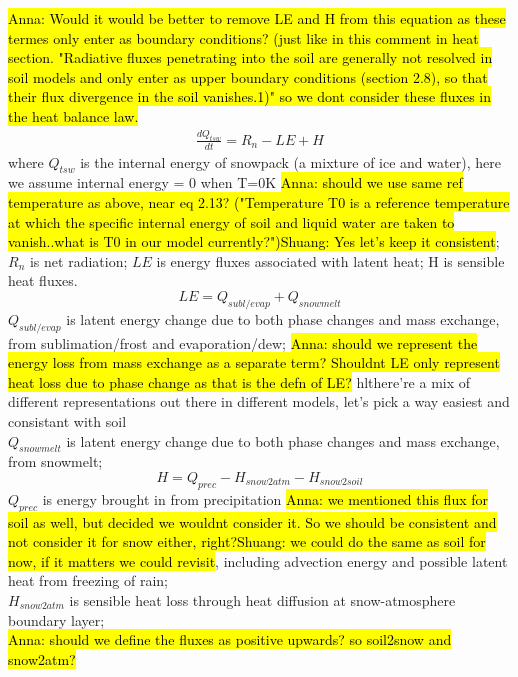 \documentclass{article}
\begin{document}
\hl{Anna: Would it would be better to remove LE and H from this equation as these termes only enter as boundary conditions? (just like in this comment in heat section. "Radiative
fluxes penetrating into the soil are generally not resolved in soil models and only
enter as upper boundary conditions (section 2.8), so that their flux divergence in
the soil vanishes.1)" so we dont consider these fluxes in the heat balance law.}
\begin{equation}
\begin{split}
\frac{dQ_{tsw}}{dt} = R_n - LE + H
\end{split}
\end{equation}
where $Q_{tsw}$ is the internal energy of snowpack (a mixture of ice and water), here we assume internal energy = 0 when T=0K \hl{Anna: should we use same ref temperature as above, near eq 2.13? ("Temperature T0 is a reference temperature at which the specific internal energy of
soil and liquid water are taken to vanish..what is T0 in our model currently?")}\hl{Shuang: Yes let's keep it consistent}; $R_n$ is net radiation; $LE$ is energy fluxes associated with latent heat; H is sensible heat fluxes. 
\begin{equation}
LE = Q_{subl/evap}+Q_{snowmelt}
\end{equation}
$Q_{subl/evap}$ is latent energy change due to both phase changes and mass exchange, from sublimation/frost and evaporation/dew; \hl{Anna: should we represent the energy loss from mass exchange as a separate term? Shouldnt LE only represent heat loss due to phase change as that is the defn of LE? }hl{there're a mix of different representations out there in different models, let's pick a way easiest and consistant with soil}\\
$Q_{snowmelt}$ is latent energy change due to both phase changes and mass exchange, from snowmelt; \\
\begin{equation}
H =  Q_{prec}- H_{snow2atm} - H_{snow2soil}
\end{equation}
$Q_{prec}$ is energy brought in from precipitation \hl{Anna: we mentioned this flux for soil as well, but decided we wouldnt consider it. So we should be consistent and not consider it for snow either, right?}\hl{Shuang: we could do the same as soil for now, if it matters we could revisit}, including advection energy and possible latent heat from freezing of rain; \\
$H_{snow2atm}$ is sensible heat loss through heat diffusion at snow-atmosphere boundary layer;\\ \hl{Anna: should we define the fluxes as positive upwards? so soil2snow and snow2atm?}
\end{document}
